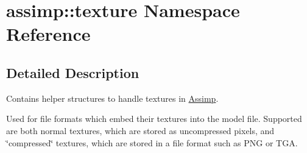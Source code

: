 \hypertarget{namespaceassimp_1_1texture}{\section{assimp\+:\+:texture Namespace Reference}
\label{namespaceassimp_1_1texture}
}


\subsection{Detailed Description}
Contains helper structures to handle textures in \hyperlink{class_assimp}{Assimp}.

Used for file formats which embed their textures into the model file. Supported are both normal textures, which are stored as uncompressed pixels, and \char`\"{}compressed\char`\"{} textures, which are stored in a file format such as P\+N\+G or T\+G\+A. 